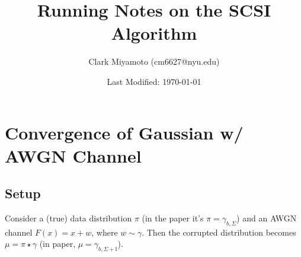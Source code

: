 \documentclass[12pt,fleqn]{article}
\title{Running Notes on the SCSI Algorithm}
\author{Clark Miyamoto (cm6627@nyu.edu)}
\date{Last Modified: \today}
\numberwithin{equation}{section}
\begin{document}
\maketitle

\tableofcontents

\section{Convergence of Gaussian w/ AWGN Channel}
\subsection{Setup}
Consider a (true) data distribution $\pi$ (in the paper it's $\pi = \gamma_{b,\Sigma}$) and an AWGN channel $F(x) = x + w$, where $w \sim \gamma$. Then the corrupted distribution becomes $\mu = \pi \star \gamma$ (in paper, $\mu = \gamma_{b,\Sigma + \mathbb I}$).
\end{document}
